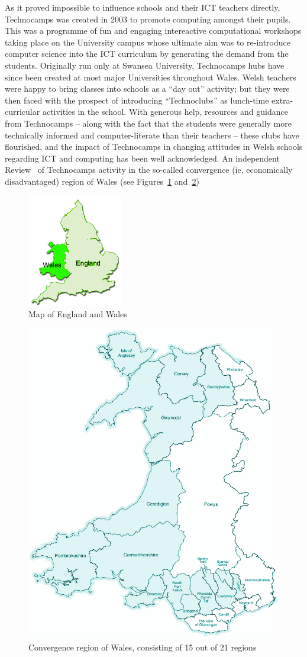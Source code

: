 \documentclass{sig-alternate}
\begin{document}
As it proved impossible to influence schools and their ICT teachers directly,
Technocamps was created in 2003 to promote computing amongst their pupils.
This was a programme of fun and engaging intereactive computational workshops
taking place on the University campus
whose ultimate aim was to re-introduce computer science into
the ICT curriculum by generating the demand from the students.
Originally run only at Swansea University,
Technocamps hubs have since been created at most major Universities
throughout Wales.
Welsh teachers were happy to bring classes into schools
as a ``day out'' activity; but they were then faced with
the prospect of introducing ``Technoclubs'' as lunch-time
extra-curricular activities in the school.
With generous help, resources and guidance from Technocamps
-- along with the fact that the students were generally
more technically informed and computer-literate than their teachers -- 
these clubs have flourished, and the impact of Technocamps
in changing attitudes in Welsh schools regarding ICT and computing
has been well acknowledged.
An independent Review~\cite{Wavehill:2015}
of Technocamps activity in the so-called convergence
(ie, economically disadvantaged) region of Wales
(see Figures~\ref{fig:UK} and~\ref{fig:wales})
\begin{figure}
  \centering
  \includegraphics[width=0.45\columnwidth]{images/UK.png}
  \caption{Map of England and Wales}
  \label{fig:UK}
\end{figure}
\begin{figure}
  \centering
  \includegraphics[width=0.45\columnwidth]{images/wales.png}
  \caption{Convergence region of Wales, consisting of 15 out of 21 regions}
  \label{fig:wales}
\end{figure}
\end{document}
